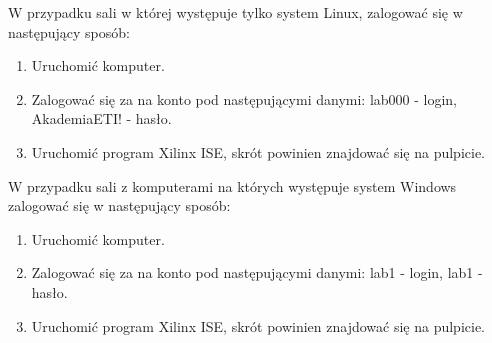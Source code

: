 \documentclass{article}
\begin{document}
W przypadku sali w której występuje tylko system Linux, zalogować się w następujący sposób:
\begin{enumerate}
\item Uruchomić komputer.
\item Zalogować się za na konto pod następującymi danymi: lab000 - login, AkademiaETI! - hasło.
\item Uruchomić program Xilinx ISE, skrót powinien znajdować się na pulpicie.
\end{enumerate}
W przypadku sali z komputerami na których występuje system Windows zalogować się w następujący sposób:
\begin{enumerate}
\item Uruchomić komputer.
\item Zalogować się za na konto pod następującymi danymi: lab1 - login, lab1 - hasło.
\item Uruchomić program Xilinx ISE, skrót powinien znajdować się na pulpicie.
\end{enumerate}
\end{document}

